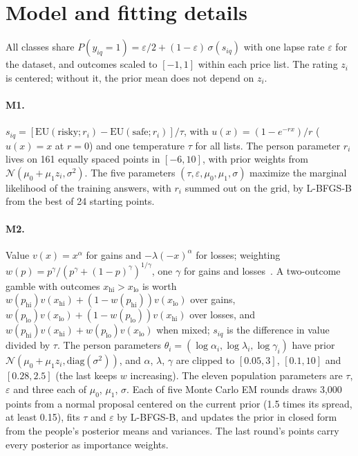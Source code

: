 \documentclass{article}
\begin{document}



\appendix
\section{Model and fitting details}\label{app:models}
All classes share $P(y_{iq} = 1) = \varepsilon/2 + (1 - \varepsilon)\,\sigma(s_{iq})$ with one lapse rate $\varepsilon$ for the dataset, and outcomes scaled to $[-1, 1]$ within each price list. The rating $z_i$ is centered; without it, the prior mean does not depend on $z_i$.

\paragraph{M1.} $s_{iq} = [\mathrm{EU}(\text{risky}; r_i) - \mathrm{EU}(\text{safe}; r_i)]/\tau$, with $u(x) = (1 - e^{-r x})/r$ ($u(x) = x$ at $r = 0$) and one temperature $\tau$ for all lists. The person parameter $r_i$ lives on 161 equally spaced points in $[-6, 10]$, with prior weights from $\mathcal{N}(\mu_0 + \mu_1 z_i, \sigma^2)$. The five parameters $(\tau, \varepsilon, \mu_0, \mu_1, \sigma)$ maximize the marginal likelihood of the training answers, with $r_i$ summed out on the grid, by L-BFGS-B from the best of 24 starting points.

\paragraph{M2.} Value $v(x) = x^{\alpha}$ for gains and $-\lambda(-x)^{\alpha}$ for losses; weighting $w(p) = p^{\gamma}/(p^{\gamma} + (1-p)^{\gamma})^{1/\gamma}$, one $\gamma$ for gains and losses~\citep{tversky1992}. A two-outcome gamble with outcomes $x_{\mathrm{hi}} > x_{\mathrm{lo}}$ is worth $w(p_{\mathrm{hi}})v(x_{\mathrm{hi}}) + (1 - w(p_{\mathrm{hi}}))v(x_{\mathrm{lo}})$ over gains, $w(p_{\mathrm{lo}})v(x_{\mathrm{lo}}) + (1 - w(p_{\mathrm{lo}}))v(x_{\mathrm{hi}})$ over losses, and $w(p_{\mathrm{hi}})v(x_{\mathrm{hi}}) + w(p_{\mathrm{lo}})v(x_{\mathrm{lo}})$ when mixed; $s_{iq}$ is the difference in value divided by $\tau$. The person parameters $\theta_i = (\log\alpha_i, \log\lambda_i, \log\gamma_i)$ have prior $\mathcal{N}(\mu_0 + \mu_1 z_i, \mathrm{diag}(\sigma^2))$, and $\alpha$, $\lambda$, $\gamma$ are clipped to $[0.05, 3]$, $[0.1, 10]$ and $[0.28, 2.5]$ (the last keeps $w$ increasing). The eleven population parameters are $\tau$, $\varepsilon$ and three each of $\mu_0$, $\mu_1$, $\sigma$. Each of five Monte Carlo EM rounds draws 3,000 points from a normal proposal centered on the current prior (1.5 times its spread, at least 0.15), fits $\tau$ and $\varepsilon$ by L-BFGS-B, and updates the prior in closed form from the people's posterior means and variances. The last round's points carry every posterior as importance weights.
\end{document}
